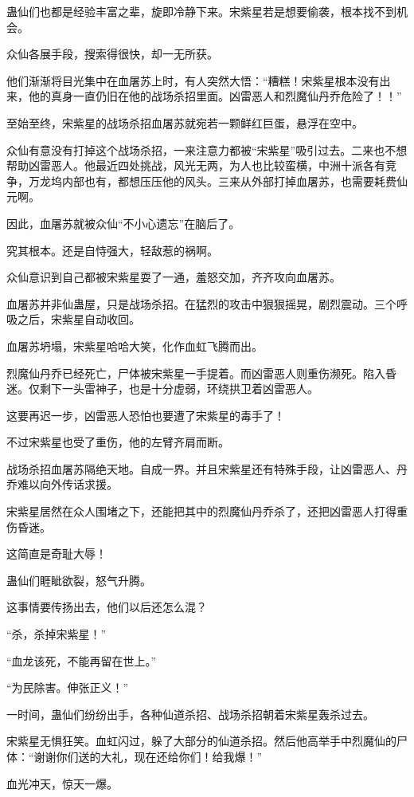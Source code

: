 \begin{this_body}
蛊仙们也都是经验丰富之辈，旋即冷静下来。宋紫星若是想要偷袭，根本找不到机会。

众仙各展手段，搜索得很快，却一无所获。

他们渐渐将目光集中在血屠苏上时，有人突然大悟：“糟糕！宋紫星根本没有出来，他的真身一直仍旧在他的战场杀招里面。凶雷恶人和烈魔仙丹乔危险了！！”

至始至终，宋紫星的战场杀招血屠苏就宛若一颗鲜红巨蛋，悬浮在空中。

众仙有意没有打掉这个战场杀招，一来注意力都被“宋紫星”吸引过去。二来也不想帮助凶雷恶人。他最近四处挑战，风光无两，为人也比较蛮横，中洲十派各有竞争，万龙坞内部也有，都想压压他的风头。三来从外部打掉血屠苏，也需要耗费仙元啊。

因此，血屠苏就被众仙“不小心遗忘”在脑后了。

究其根本。还是自恃强大，轻敌惹的祸啊。

众仙意识到自己都被宋紫星耍了一通，羞怒交加，齐齐攻向血屠苏。

血屠苏并非仙蛊屋，只是战场杀招。在猛烈的攻击中狠狠摇晃，剧烈震动。三个呼吸之后，宋紫星自动收回。

血屠苏坍塌，宋紫星哈哈大笑，化作血虹飞腾而出。

烈魔仙丹乔已经死亡，尸体被宋紫星一手提着。而凶雷恶人则重伤濒死。陷入昏迷。仅剩下一头雷神子，也是十分虚弱，环绕拱卫着凶雷恶人。

这要再迟一步，凶雷恶人恐怕也要遭了宋紫星的毒手了！

不过宋紫星也受了重伤，他的左臂齐肩而断。

战场杀招血屠苏隔绝天地。自成一界。并且宋紫星还有特殊手段，让凶雷恶人、丹乔难以向外传话求援。

宋紫星居然在众人围堵之下，还能把其中的烈魔仙丹乔杀了，还把凶雷恶人打得重伤昏迷。

这简直是奇耻大辱！

蛊仙们睚眦欲裂，怒气升腾。

这事情要传扬出去，他们以后还怎么混？

“杀，杀掉宋紫星！”

“血龙该死，不能再留在世上。”

“为民除害。伸张正义！”

一时间，蛊仙们纷纷出手，各种仙道杀招、战场杀招朝着宋紫星轰杀过去。

宋紫星无惧狂笑。血虹闪过，躲了大部分的仙道杀招。然后他高举手中烈魔仙的尸体：“谢谢你们送的大礼，现在还给你们！给我爆！”

血光冲天，惊天一爆。


\end{this_body}
